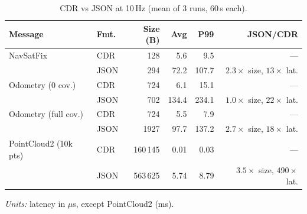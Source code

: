 \begin{table}[t]
\caption{CDR vs JSON at 10\,Hz (mean of 3 runs, 60\,s each).}
\label{tab:cdr_json_summary}
\centering
\scriptsize
\setlength{\tabcolsep}{3pt}
\begin{tabular}{llrrrr}
\toprule
\textbf{Message} & \textbf{Fmt.} & \textbf{Size (B)} & \textbf{Avg} & \textbf{P99} & \textbf{JSON/CDR} \\
\midrule
NavSatFix & CDR  & 128     & 5.6   & 9.5   & --- \\
          & JSON & 294     & 72.2  & 107.7 & $2.3\times$ size, $13\times$ lat. \\
\addlinespace
Odometry (0 cov.) & CDR  & 724   & 6.1   & 15.1  & --- \\
                   & JSON & 702   & 134.4 & 234.1 & $1.0\times$ size, $22\times$ lat. \\
\addlinespace
Odometry (full cov.) & CDR  & 724  & 5.5   & 7.9   & --- \\
                      & JSON & 1927 & 97.7  & 137.2 & $2.7\times$ size, $18\times$ lat. \\
\addlinespace
PointCloud2 (10k pts) & CDR  & 160\,145 & 0.01 & 0.03 & --- \\
                       & JSON & 563\,625 & 5.74 & 8.79 & $3.5\times$ size, $490\times$ lat. \\
\bottomrule
\end{tabular}
\vspace{1mm}
\footnotesize\emph{Units:} latency in $\mu$s, except PointCloud2 (ms).
\end{table}
